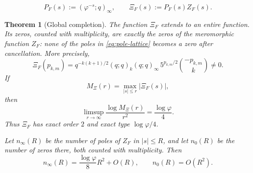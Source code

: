 \documentclass[10pt,a4paper]{amsart}
\newtheorem{theorem}{Theorem}
\newcommand{\ZF}{Z_F}
\begin{document}
\begin{equation}\label{eq:completion-def}
P_F(s):=(\varphi^{-s};q)_\infty,
\qquad
\Xi_F(s):=P_F(s)\ZF(s).
\end{equation}

\begin{theorem}[Global completion]\label{thm:completion}
The function $\Xi_F$ extends to an entire function.  Its zeros, counted with multiplicity, are exactly the zeros of the meromorphic function $\ZF$: none of the poles in \eqref{eq:pole-lattice} becomes a zero after cancellation.  More precisely,
\begin{equation}\label{eq:completion-pole-value}
\Xi_F(p_{k,m})
=q^{-k(k+1)/2}(q;q)_k(q;q)_\infty
\,5^{p_{k,m}/2}\binom{-p_{k,m}}{k}\neq0.
\end{equation}
If
\[
M_\Xi(r)=\max_{|s|\le r}|\Xi_F(s)|,
\]
then
\begin{equation}\label{eq:completion-type}
\limsup_{r\to\infty}\frac{\log M_\Xi(r)}{r^2}
=\frac{\log\varphi}{4}.
\end{equation}
Thus $\Xi_F$ has exact order $2$ and exact type $\log\varphi/4$.

Let $n_\infty(R)$ be the number of poles of $\ZF$ in $|s|\le R$, and let $n_0(R)$ be the number of zeros there, both counted with multiplicity.  Then
\begin{equation}\label{eq:global-counting}
n_\infty(R)
=\frac{\log\varphi}{8}R^2+O(R),
\qquad
n_0(R)=O(R^2).
\end{equation}
\end{theorem}
\end{document}
